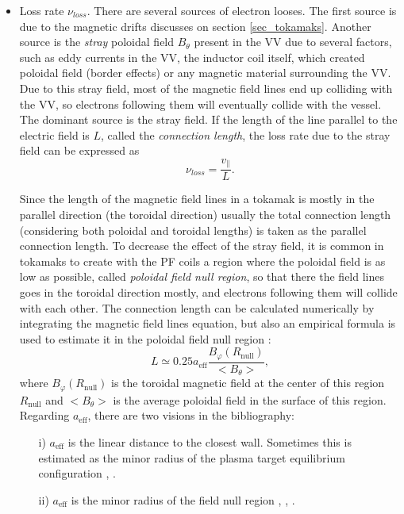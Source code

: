 \documentclass[a4paper,12pt,oneside]{book}
\begin{document}
\begin{itemize}
	\item Loss rate $\nu_{loss}$. There are several sources of electron looses. The first source is due to the magnetic drifts discusses on section \ref{sec_tokamaks}. Another source is the \textit{stray} poloidal field $B_\theta$ present in the VV due to several factors, such as eddy currents in the VV, the inductor coil itself, which created poloidal field (border effects) or any magnetic material surrounding the VV. Due to this stray field, most of the magnetic field lines end up colliding with the VV, so electrons following them will eventually collide with the vessel. The dominant source is the stray field. If the length of the line parallel to the electric field is $L$, called the \textit{connection length}, the loss rate due to the stray field can be expressed as
%
	\begin{equation}\label{nu loss}
\nu_{loss} = \dfrac{v_{\parallel}}{L}.
	\end{equation}

Since the length of the magnetic field lines in a tokamak is mostly in the parallel direction (the toroidal direction) usually the total connection length (considering both poloidal and toroidal lengths) is taken as the parallel connection length. To decrease the effect of the stray field, it is common in tokamaks to create with the PF coils a region where the poloidal field is as low as possible, called \textit{poloidal field null region}, so that there the field lines goes in the toroidal direction mostly, and electrons following them will collide with each other. The connection length can be calculated numerically by integrating the magnetic field lines equation, but also an empirical formula is used to estimate it in the poloidal field null region \cite{ITER_2007}:
%
	\begin{equation}\label{ec L}
L \simeq 0.25 a_\text{eff}\dfrac{B_\varphi(R_{\text{null}})}{<B_\theta>},
	\end{equation}
where $B_\varphi(R_{\text{null}})$ is the toroidal magnetic field at the center of this region $R_{\text{null}}$ and $<B_\theta>$ is the average poloidal field in the surface of this region. Regarding $a_\text{eff}$, there are two visions in the bibliography:
%
	\begin{itemize}
		\item[i)] $a_\text{eff}$ is the linear distance to the closest wall. Sometimes this is estimated as the minor radius of the plasma target equilibrium configuration \cite{KimThesis}, \cite{Lloyd_1991}.
		\item[ii)] $a_\text{eff}$ is the minor radius of the field null region \cite{TCV_thesis}, \cite{ITER_2007}, \cite{ITER_2019}.
	\end{itemize}

\end{itemize}
\end{document}
